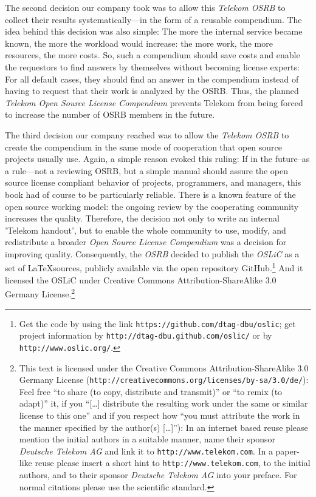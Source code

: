 The second decision our company took was to allow this \emph{Telekom OSRB} to
collect their results systematically---in the form of a reusable compendium.
The idea behind this decision was also simple: The more the internal service
became known, the more the workload would increase: the more work, the more
resources, the more costs. So, such a compendium should save costs and enable
the requestors to find answers by themselves without becoming license experts:
For all default cases, they should find an answer in the compendium instead of
having to request that their work is analyzed by the OSRB. Thus, the planned
\emph{Telekom Open Source License Compendium} prevents Telekom from being forced
to increase the number of OSRB members in the future.

The third decision our company reached was to allow the \emph{Telekom OSRB} to
create the compendium in the same mode of cooperation that open source projects
usually use. Again, a simple reason evoked this ruling: If in the future--as a
rule---not a reviewing OSRB, but a simple manual should assure the open 
source license compliant behavior of projects, programmers, and managers, this
book had of course to be particularly reliable. There is a known feature of the
open source working model: the ongoing review by the cooperating community
increases the quality. Therefore, the decision not only to write an internal
'Telekom handout', but to enable the whole community to use, modify, and 
redistribute a broader \emph{Open Source License Compendium} was a decision for
improving quality. Consequently, the \emph{OSRB} decided to publish the
\emph{OSLiC} as a set of \LaTeX sources, publicly available via the open
repository GitHub.\footnote{Get the code by using the link
\texttt{https://github.com/dtag-dbu/oslic}; get project information by
\texttt{http://dtag-dbu.github.com/oslic/} or by
\texttt{http://www.oslic.org/}.}  And it licensed the OSLiC under Creative
Commons Attribution-ShareAlike 3.0 Germany License.\footnote{ This text is
licensed under the Creative Commons Attribution-ShareAlike 3.0 Germany License
(\texttt{http://creativecommons.org/licenses/by-sa/3.0/de/}): Feel free
\enquote{to share (to copy, distribute and transmit)} or \enquote{to remix (to
adapt)} it, if you \enquote{[\ldots] distribute the resulting work under the
same or similar license to this one} and if you respect how \enquote{you must
attribute the work in the manner specified by the author(s) [\ldots]}):
In an internet based reuse please mention the initial authors in a suitable
manner, name their sponsor \textit{Deutsche Telekom AG} and link it to
\texttt{http://www.telekom.com}. In a paper-like reuse please insert a short
hint to \texttt{http://www.telekom.com}, to the initial authors, and to their
sponsor \textit{Deutsche Telekom AG} into your preface. For normal citations
please use the scientific standard.}

